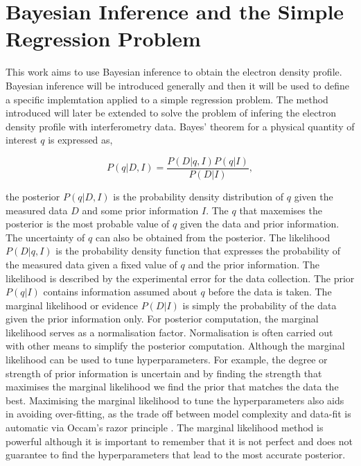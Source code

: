 \section{Bayesian Inference and the Simple Regression Problem}
\label{sec:BIandSRP}

This work aims to use Bayesian inference to obtain the electron density profile. Bayesian inference will be introduced generally and then it will be used to define a specific implemtation applied to a simple regression problem. The method introduced will later be extended to solve the problem of infering the electron density profile with interferometry data. Bayes' theorem for a physical quantity of interest $q$ is expressed as,

\begin{equation}
P(q|D,I) = \frac{P(D|q,I) P(q|I)}{P(D|I)},
\label{eq:bayesth}
\end{equation}

\noindent the posterior $P(q|D,I)$ is the probability density distribution of $q$ given the measured data $D$ and some prior information $I$. The $q$ that maxemises the posterior is the most probable value of $q$ given the data and prior information. The uncertainty of $q$ can also be obtained from the posterior. The likelihood $P(D|q,I)$ is the probability density function that expresses the probability of the measured data given a fixed value of $q$ and the prior information. The likelihood is described by the experimental error for the data collection. The prior $P(q|I)$ contains information assumed about $q$ before the data is taken. The marginal likelihood or evidence $P(D|I)$ is simply the probability of the data given the prior information only. For posterior computation, the marginal likelihood serves as a normalisation factor. Normalisation is often carried out with other means to simplify the posterior computation. Although the marginal likelihood can be used to tune hyperparameters. For example, the degree or strength of prior information is uncertain and by finding the strength that maximises the marginal likelihood we find the prior that matches the data the best. Maximising the marginal likelihood to tune the hyperparameters also aids in avoiding over-fitting, as the trade off between model complexity and data-fit is automatic via Occam's razor principle \cite{oscraz}. The marginal likelihood method is powerful although it is important to remember that it is not perfect and does not guarantee to find the hyperparameters that lead to the most accurate posterior.

